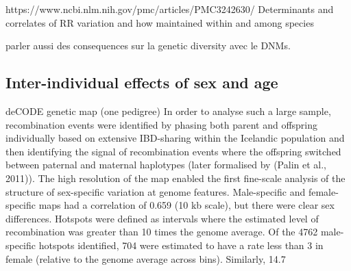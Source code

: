 
https://www.ncbi.nlm.nih.gov/pmc/articles/PMC3242630/
Determinants and correlates of RR variation and how maintained within and among species


parler aussi des consequences sur la genetic diversity avec le DNMs.




\subsection{Inter-individual effects of sex and age}

deCODE genetic map (one pedigree)
In order to analyse such a large sample, recombination events were identified by phasing both parent and offspring individually based on extensive IBD-sharing within the Icelandic population and then identifying the signal of recombination events where the offspring switched between paternal and maternal haplotypes (later formalised by (Palin et al., 2011)). 
The high resolution of the map enabled the first fine-scale analysis of the structure of sex-specific variation at genome features. 
Male-specific and female-specific maps had a correlation of 0.659 (10 kb scale), but there were clear sex differences. Hotspots were defined as intervals where the estimated level of recombination was greater than 10 times the genome average. Of the 4762 male-specific hotspots identified, 704 were estimated to have a rate less than 3 in female (relative to the genome average across bins). Similarly, 14.7%



